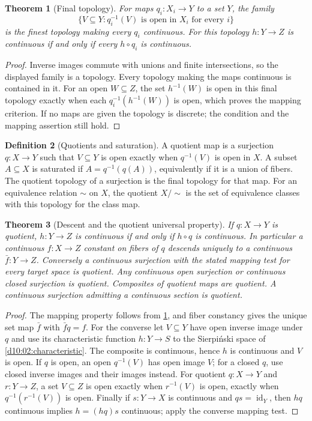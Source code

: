 \documentclass[11pt,oneside,openany]{book}
\newtheorem{theorem}{Theorem}[chapter]
\theoremstyle{definition}
\newtheorem{definition}[theorem]{Definition}
\theoremstyle{remark}
\DeclareMathOperator{\id}{id}
\begin{document}
\begin{theorem}[Final topology]\label{d10:03:final}
For maps $q_i:X_i\to Y$ to a set $Y$, the family
\[
 \{V\subseteq Y:q_i^{-1}(V)\text{ is open in }X_i\text{ for every }i\}
\]
is the finest topology making every $q_i$ continuous. For this topology $h:Y\to Z$ is continuous if and only if every $h\circ q_i$ is continuous.
\end{theorem}
\begin{proof}
Inverse images commute with unions and finite intersections, so the displayed family is a topology. Every topology making the maps continuous is contained in it. For an open $W\subseteq Z$, the set $h^{-1}(W)$ is open in this final topology exactly when each $q_i^{-1}(h^{-1}(W))$ is open, which proves the mapping criterion. If no maps are given the topology is discrete; the condition and the mapping assertion still hold.
\end{proof}

\begin{definition}[Quotients and saturation]\label{d10:03:quotient}
A quotient map is a surjection $q:X\to Y$ such that $V\subseteq Y$ is open exactly when $q^{-1}(V)$ is open in $X$. A subset $A\subseteq X$ is saturated if $A=q^{-1}(q(A))$, equivalently if it is a union of fibers. The quotient topology of a surjection is the final topology for that map. For an equivalence relation $\sim$ on $X$, the quotient $X/{\sim}$ is the set of equivalence classes with this topology for the class map.
\end{definition}

\begin{theorem}[Descent and the quotient universal property]\label{d10:03:quotient-universal}
If $q:X\to Y$ is quotient, $h:Y\to Z$ is continuous if and only if $h\circ q$ is continuous. In particular a continuous $f:X\to Z$ constant on fibers of $q$ descends uniquely to a continuous $\bar f:Y\to Z$. Conversely a continuous surjection with the stated mapping test for every target space is quotient. Any continuous open surjection or continuous closed surjection is quotient. Composites of quotient maps are quotient. A continuous surjection admitting a continuous section is quotient.
\end{theorem}
\begin{proof}
The mapping property follows from \cref{d10:03:final}, and fiber constancy gives the unique set map $\bar f$ with $\bar f q=f$. For the converse let $V\subseteq Y$ have open inverse image under $q$ and use its characteristic function $h:Y\to S$ to the Sierpi\'nski space of \cref{d10:02:characteristic}. The composite is continuous, hence $h$ is continuous and $V$ is open. If $q$ is open, an open $q^{-1}(V)$ has open image $V$; for a closed $q$, use closed inverse images and their images instead. For quotient $q:X\to Y$ and $r:Y\to Z$, a set $V\subseteq Z$ is open exactly when $r^{-1}(V)$ is open, exactly when $q^{-1}(r^{-1}(V))$ is open. Finally if $s:Y\to X$ is continuous and $qs=\id_Y$, then $h q$ continuous implies $h=(h q)s$ continuous; apply the converse mapping test.
\end{proof}
\end{document}
